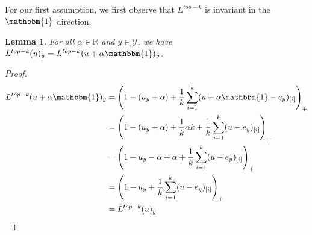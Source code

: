 \documentclass[12pt]{article}
\newcommand{\reals}{\mathbb{R}}
\newcommand{\Y}{\mathcal{Y}}
\newcommand{\ones}{\mathbbm{1}}
\newtheorem{lemma}{Lemma}
\begin{document}
For our first assumption, we first observe that $L^{top-k}$ is invariant in the $\ones$ direction.
\begin{lemma}\label{lem:invar-ones}
	For all $\alpha \in \reals$ and $y\in\Y$, we have $L^{top-k}(u)_y = L^{top-k}(u + \alpha \ones)_y$.
\end{lemma}
\begin{proof}
	\begin{align*}
	L^{top-k}(u + \alpha \ones)_y &= \left(1 - (u_y + \alpha) + \frac{1}{k} \sum_{i=1}^k (u + \alpha \ones  - e_y)_{[i]} \right)_+\\
	&= \left(1 - (u_y + \alpha) +\frac{1}{k} \alpha k + \frac{1}{k} \sum_{i=1}^k (u - e_y)_{[i]} \right)_+\\
	&= \left(1 -u_y - \alpha + \alpha + \frac{1}{k} \sum_{i=1}^k (u - e_y)_{[i]} \right)_+\\
	&= \left(1 -u_y + \frac{1}{k} \sum_{i=1}^k (u - e_y)_{[i]} \right)_+\\
	&= L^{top-k}(u)_y
	\end{align*}
\end{proof}
\end{document}
